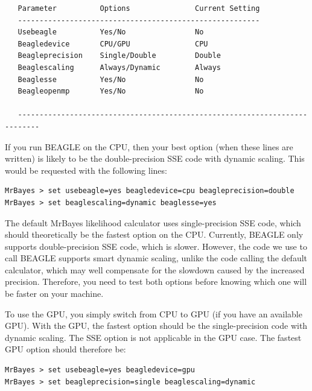 \documentclass[12pt]{book}
\begin{document}
\footnotesize
\begin{singlespacing}
\begin{verbatim}
   Parameter          Options               Current Setting                      
   --------------------------------------------------------                      
   Usebeagle          Yes/No                No                                   
   Beagledevice       CPU/GPU               CPU                                   
   Beagleprecision    Single/Double         Double                                   
   Beaglescaling      Always/Dynamic        Always                                   
   Beaglesse          Yes/No                No                                   
   Beagleopenmp       Yes/No                No                                   
                                                                                 
   ---------------------------------------------------------------------------   
\end{verbatim}
\end{singlespacing}
\normalsize

If you run BEAGLE on the CPU, then your best option (when these lines are written) is likely to be the
double-precision SSE code with dynamic scaling. This would be requested with the following lines:

\begin{verbatim}
MrBayes > set usebeagle=yes beagledevice=cpu beagleprecision=double
MrBayes > set beaglescaling=dynamic beaglesse=yes
\end{verbatim}

The default MrBayes likelihood calculator uses single-precision SSE code, which should theoretically
be the fastest option on the CPU. Currently, BEAGLE only supports double-precision SSE code, which
is slower. However, the code we use to call BEAGLE supports smart dynamic scaling, unlike
the code calling the default calculator, which may well compensate for the slowdown caused by the
increased precision. Therefore, you need to test both options before knowing which one will be faster
on your machine.

To use the GPU, you simply switch from CPU to GPU (if you have an available GPU). With the GPU,
the fastest option should be the single-precision code with dynamic scaling. The SSE option is
not applicable in the GPU case. The fastest GPU option should therefore be:

\begin{verbatim}
MrBayes > set usebeagle=yes beagledevice=gpu
MrBayes > set beagleprecision=single beaglescaling=dynamic
\end{verbatim}
\end{document}
